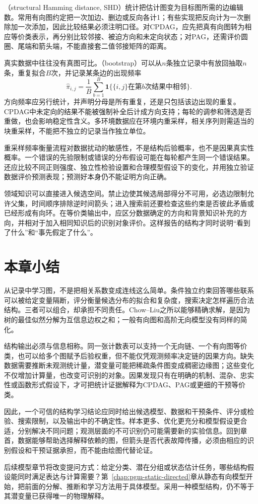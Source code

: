 （structural Hamming distance, SHD）统计把估计图变为目标图所需的边编辑数。常用有向图约定把一次加边、删边或反向各计1；有些实现把反向计为一次删除加一次添加，因此比较结果必须注明口径。对CPDAG，应先把真有向图转为相应等价类表示，再分别比较邻接、被迫方向和未定向状态；对PAG，还需评价圆圈、尾端和箭头端，不能直接套二值邻接矩阵的距离。

真实数据中往往没有真图可比。（bootstrap）可以从$n$条独立记录中有放回抽取$n$条，重复拟合$B$次，并记录某条边的出现频率
\[
  \widehat\pi_{i,j}
  =\frac1B\sum_{b=1}^{B}
       \mathbf{1}\{\{i,j\}\text{在第}b\text{次结果中相邻}\}.
\]
方向频率应另行统计，并声明分母是所有重复，还是只包括该边出现的重复。CPDAG中未定向的结果不能被强制补全后计成方向支持；每轮的调参和筛选是否重做，也会影响稳定性含义。多环境数据应在环境内重采样，相关序列则需适当的块重采样，不能把不独立的记录当作独立单位。

重采样频率衡量流程对数据扰动的敏感性，不是结构后验概率，也不是因果真实性概率。一个错误的先验限制或错误的分布假设可能在每轮都产生同一个错误结果。还应比较不同正则强度、独立性检验设置和合理模型假设下的变化，并用独立验证数据评价预测表现；预测好本身仍不能证明方向正确。

领域知识可以直接进入候选空间。禁止边使其候选局部得分不可用，必选边限制允许父集，时间顺序排除逆时间箭头；进入搜索前还要检查这些约束是否彼此矛盾或已经形成有向环。在等价类输出中，应区分数据确定的方向和背景知识补充的方向，并相对于加入相同知识后的识别对象评价。这样报告的结构才同时说明“看到了什么”和“事先假定了什么”。

\section{本章小结}
\label{sec:pgm-structure-learning-summary}

从记录中学习图，不是把相关系数变成连线这么简单。条件独立约束回答哪些联系可以被给定变量隔断，评分衡量候选分布的拟合和复杂度，搜索决定怎样遍历合法结构。三者可以组合，却承担不同责任。Chow--Liu之所以能够精确求解，是因为树的最佳似然分解为互信息边权之和；一般有向图和高阶无向模型没有同样的简化。

结构输出必须与信息相称。同一张计数表可以支持一个无向链、一个有向图等价类，也可以给多个图赋予后验权重，但不能仅凭观测频率决定链的因果方向。缺失数据需要推断未观测统计量，潜变量可能把稀疏条件图变成稠密边缘图；这些变化不仅增加计算量，也改变可识别的对象。因果发现只有在明确的机制、混杂、忠实性或函数形式假设下，才可把统计证据解释为CPDAG、PAG或更细的干预等价类。

因此，一个可信的结构学习结论应同时给出候选模型、数据和干预条件、评分或检验、搜索限制，以及输出中的不确定性。样本更多、优化更充分和模型假设更合适，分别解决不同问题；观测层面的不可识别仍可能需要新的实验信息。回到章首，数据能够帮助选择解释依赖的图，但箭头是否代表故障传播，必须由相应的识别假设和干预证据承担，而不能由绘图代替论证。

后续模型章节将改变提问方式：给定分类、潜在分组或状态估计任务，哪些结构假设能同时满足表达与计算需要？第~\ref{chap:pgm-static-directed}章从静态有向模型开始，把前面的分解、推断和学习方法用于具体模型。采用一种模型结构，仍不等于其潜变量已获得唯一的物理解释。
